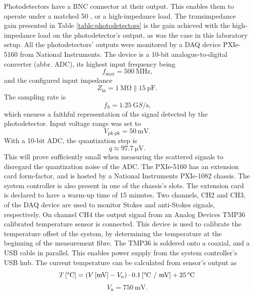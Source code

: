 \documentclass{standalone}
\begin{document}
Photodetectors have a BNC connector at their output. This enables them to operate under a matched 50 \textOmega, or a high-impedance load. The transimpedance gain presented in Table \ref{table:photodetectors} is the gain achieved with the high-impedance load on the photodetector's output, as was the case in this laboratory setup. All the photodetectors' outputs were monitored by a DAQ device PXIe-5160 from National Instruments. The device is a 10-bit analogue-to-digital converter (abbr. ADC), its highest input frequency being \cite{datasheet:daq}
\begin{equation}
f_\textrm{max} = \SI{500}{\mega \hertz} \textrm{,}
\end{equation}
and the configured input impedance
\begin{equation}
Z_\textrm{in} = \SI{1}{\mega \ohm} \| \SI{15}{\pico \farad} \textrm{.}
\end{equation}
The sampling rate is
\begin{equation}
f_\textrm{S} = \SI{1.25}{\giga S / \second} \textrm{,}
\end{equation}
which ensures a faithful representation of the signal detected by the photodetector. Input voltage range was set to
\begin{equation}
V_\textrm{pk-pk} = \SI{50}{\milli \volt} \textrm{.}
\end{equation}
With a 10-bit ADC, the quantization step is
\begin{equation}
q \approx \SI{97.7}{\micro \volt} \textrm{.}
\end{equation}
This will prove sufficiently small when measuring the scattered signals to disregard the quantization noise of the ADC. The PXIe-5160 has an extension card form-factor, and is hosted by a National Instruments PXIe-1082 chassis. The system controller is also present in one of the chassis's slots. The extension card is declared to have a warm-up time of 15 minutes. Two channels, CH2 and CH3, of the DAQ device are used to monitor Stokes and anti-Stokes signals, respectively. On channel CH4 the output signal from an Analog Devices TMP36 calibrated temperature sensor is connected. This device is used to calibrate the temperature offset of the system, by determining the temperature at the beginning of the measurement fibre. The TMP36 is soldered onto a coaxial, and a USB cable in parallel. This enables power supply from the system controller's USB hub. The current temperature can be calculated from sensor's output as \cite{datasheet:tmp36}
\begin{equation}
T \, \textrm{[\textdegree C]} = \left( V \, \textrm{[mV]} - V_\textrm{n} \right) \cdot 0.1 \, \textrm{[\textdegree C / mV]} + 25 \, \textrm{\textdegree C}
\end{equation}
\begin{equation}
V_\textrm{n} = \SI{750}{\milli \volt} \textrm{.}
\end{equation} \\
\end{document}
